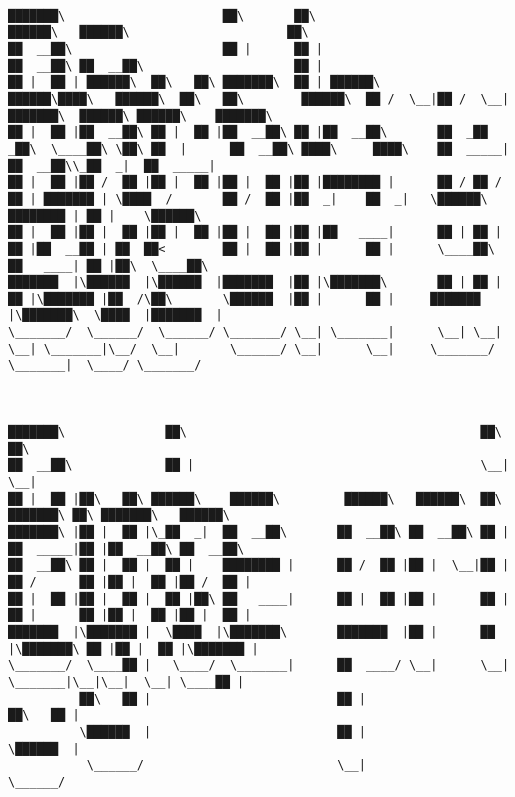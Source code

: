 \documentclass[varwidth=\maxdimen,margin=0.5cm,multi={verbatim}]{standalone}
\begin{document}
\begin{verbatim}

███████\                      ██\       ██\                                                                    ██████\   ██████\                      ██\
██  __██\                     ██ |      ██ |                                                                  ██  __██\ ██  __██\                     ██ |
██ |  ██ | ██████\  ██\   ██\ ███████\  ██ | ██████\        ██████\████\   ██████\  ██\   ██\        ██████\  ██ /  \__|██ /  \__|███████\  ██████\ ██████\    ███████\
██ |  ██ |██  __██\ ██ |  ██ |██  __██\ ██ |██  __██\       ██  _██  _██\  \____██\ \██\ ██  |      ██  __██\ ████\     ████\    ██  _____|██  __██\\_██  _|  ██  _____|
██ |  ██ |██ /  ██ |██ |  ██ |██ |  ██ |██ |████████ |      ██ / ██ / ██ | ███████ | \████  /       ██ /  ██ |██  _|    ██  _|   \██████\  ████████ | ██ |    \██████\
██ |  ██ |██ |  ██ |██ |  ██ |██ |  ██ |██ |██   ____|      ██ | ██ | ██ |██  __██ | ██  ██<        ██ |  ██ |██ |      ██ |      \____██\ ██   ____| ██ |██\  \____██\
███████  |\██████  |\██████  |███████  |██ |\███████\       ██ | ██ | ██ |\███████ |██  /\██\       \██████  |██ |      ██ |     ███████  |\███████\  \████  |███████  |
\_______/  \______/  \______/ \_______/ \__| \_______|      \__| \__| \__| \_______|\__/  \__|       \______/ \__|      \__|     \_______/  \_______|  \____/ \_______/



███████\              ██\                                         ██\           ██\
██  __██\             ██ |                                        \__|          \__|
██ |  ██ |██\   ██\ ██████\    ██████\         ██████\   ██████\  ██\  ███████\ ██\ ███████\   ██████\
███████\ |██ |  ██ |\_██  _|  ██  __██\       ██  __██\ ██  __██\ ██ |██  _____|██ |██  __██\ ██  __██\
██  __██\ ██ |  ██ |  ██ |    ████████ |      ██ /  ██ |██ |  \__|██ |██ /      ██ |██ |  ██ |██ /  ██ |
██ |  ██ |██ |  ██ |  ██ |██\ ██   ____|      ██ |  ██ |██ |      ██ |██ |      ██ |██ |  ██ |██ |  ██ |
███████  |\███████ |  \████  |\███████\       ███████  |██ |      ██ |\███████\ ██ |██ |  ██ |\███████ |
\_______/  \____██ |   \____/  \_______|      ██  ____/ \__|      \__| \_______|\__|\__|  \__| \____██ |
          ██\   ██ |                          ██ |                                            ██\   ██ |
          \██████  |                          ██ |                                            \██████  |
           \______/                           \__|                                             \______/



\end{verbatim}
\end{document}
